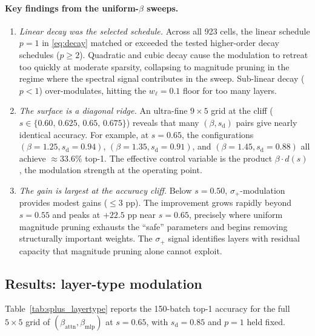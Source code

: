 \documentclass[11pt]{article}
\theoremstyle{plain}
\theoremstyle{definition}
\theoremstyle{remark}
\newcommand{\1}{\mathbf{1}}
\begin{document}
\paragraph{Key findings from the uniform-\(\beta\) sweeps.}

\begin{enumerate}[leftmargin=2em]
\item \emph{Linear decay was the selected schedule.}  Across all 923 cells, the linear schedule \(p=1\) in \eqref{eq:decay} matched or exceeded the tested higher-order decay schedules (\(p\ge 2\)).  Quadratic and cubic decay cause the modulation to retreat too quickly at moderate sparsity, collapsing to magnitude pruning in the regime where the spectral signal contributes in the sweep.  Sub-linear decay (\(p<1\)) over-modulates, hitting the \(w_\ell=0.1\) floor for too many layers.

\item \emph{The surface is a diagonal ridge.}  An ultra-fine \(9\times 5\) grid at the cliff (\(s\in\{0.60,\,0.625,\,0.65,\,0.675\}\)) reveals that many \((\beta, s_{\mathrm{d}})\) pairs give nearly identical accuracy.  For example, at \(s=0.65\), the configurations \((\beta=1.25, s_{\mathrm{d}}=0.94)\), \((\beta=1.35, s_{\mathrm{d}}=0.91)\), and \((\beta=1.45, s_{\mathrm{d}}=0.88)\) all achieve \(\approx 33.6\%\) top-1.  The effective control variable is the product \(\beta \cdot d(s)\), the modulation strength at the operating point.

\item \emph{The gain is largest at the accuracy cliff.}  Below \(s=0.50\), \(\sigma_+\)-modulation provides modest gains (\({\le}3\) pp).  The improvement grows rapidly beyond \(s=0.55\) and peaks at \(+22.5\) pp near \(s=0.65\), precisely where uniform magnitude pruning exhausts the ``safe'' parameters and begins removing structurally important weights.  The \(\sigma_+\) signal identifies layers with residual capacity that magnitude pruning alone cannot exploit.
\end{enumerate}

\subsection{Results: layer-type modulation}
\label{subsec:layertype_results}

Table~\ref{tab:splus_layertype} reports the 150-batch top-1 accuracy for the full \(5\times 5\) grid of \((\beta_{\mathrm{attn}}, \beta_{\mathrm{mlp}})\) at \(s=0.65\), with \(s_{\mathrm{d}}=0.85\) and \(p=1\) held fixed.
\end{document}

